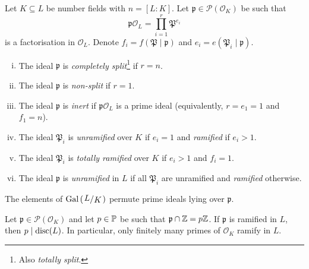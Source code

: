 \begin{definicija}
Let $K \subseteq L$ be number fields with $n = [L : K]$. Let
$\mathfrak{p} \in \mathcal{P}(\mathcal{O}_K)$ be such that
\[
\mathfrak{p} \mathcal{O}_L =
\prod_{i=1}^r \mathfrak{P}^{e_i}
\]
is a factorisation in $\mathcal{O}_L$. Denote
$f_i = f(\mathfrak{P} \mid \mathfrak{p})$ and
$e_i = e(\mathfrak{P}_i \mid \mathfrak{p})$.

\begin{enumerate}[i)]
\item The ideal $\mathfrak{p}$ is
\emph{completely split}\footnote{Also
\emph{totally split}.} if $r=n$.
\item The ideal $\mathfrak{p}$ is \emph{non-split}
if $r=1$.
\item The ideal $\mathfrak{p}$ is \emph{inert} if
$\mathfrak{p} \mathcal{O}_L$ is a prime ideal (equivalently,
$r=e_1=1$ and $f_1=n$).
\item The ideal $\mathfrak{P}_i$ is
\emph{unramified} over $K$ if $e_i=1$
and \emph{ramified} if $e_i>1$.
\item The ideal $\mathfrak{P}_i$ is \emph{totally ramified} over
$K$ if $e_i>1$ and $f_i=1$.
\item The ideal $\mathfrak{p}$ is \emph{unramified} in $L$ if all
$\mathfrak{P}_i$ are unramified and \emph{ramified} otherwise.
\end{enumerate}
\end{definicija}

\begin{opomba}
The elements of $\Gal \br{\kvoc{L}{K}}$ permute prime ideals lying
over $\mathfrak{p}$.
\end{opomba}

\begin{izrek}
Let $\mathfrak{p} \in \mathcal{P}(\mathcal{O}_K)$ and let
$p \in \P$ be such that $\mathfrak{p} \cap \Z = p\Z$. If
$\mathfrak{p}$ is ramified in $L$, then $p \mid \disc(L)$. In
particular, only finitely many primes of $\mathcal{O}_K$ ramify in
$L$.
\end{izrek}

